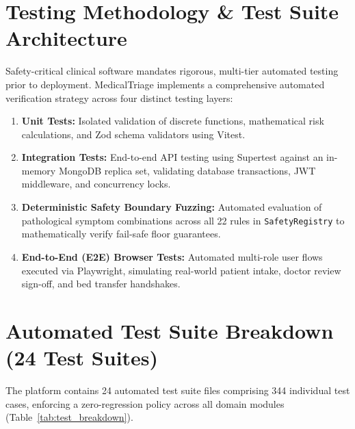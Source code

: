 \documentclass[11pt,a4paper,oneside]{report}
\begin{document}
\section{Testing Methodology \& Test Suite Architecture}
Safety-critical clinical software mandates rigorous, multi-tier automated testing prior to deployment. MedicalTriage implements a comprehensive automated verification strategy across four distinct testing layers:
\begin{enumerate}[leftmargin=20pt]
  \item \textbf{Unit Tests:} Isolated validation of discrete functions, mathematical risk calculations, and Zod schema validators using Vitest.
  \item \textbf{Integration Tests:} End-to-end API testing using Supertest against an in-memory MongoDB replica set, validating database transactions, JWT middleware, and concurrency locks.
  \item \textbf{Deterministic Safety Boundary Fuzzing:} Automated evaluation of pathological symptom combinations across all 22 rules in \texttt{SafetyRegistry} to mathematically verify fail-safe floor guarantees.
  \item \textbf{End-to-End (E2E) Browser Tests:} Automated multi-role user flows executed via Playwright, simulating real-world patient intake, doctor review sign-off, and bed transfer handshakes.
\end{enumerate}

\section{Automated Test Suite Breakdown (24 Test Suites)}
The platform contains 24 automated test suite files comprising 344 individual test cases, enforcing a zero-regression policy across all domain modules (Table~\ref{tab:test_breakdown}).
\end{document}

